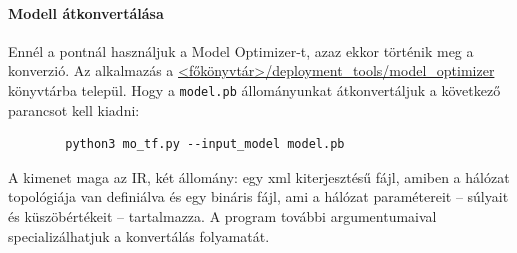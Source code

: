 \paragraph*{Modell átkonvertálása}
	Ennél a pontnál használjuk a Model Optimizer-t, azaz ekkor történik meg a konverzió. Az alkalmazás a \url{<főkönyvtár>/deployment_tools/model_optimizer} könyvtárba települ. Hogy a \verb|model.pb| állományunkat átkonvertáljuk a következő parancsot kell kiadni:
	\begin{verbatim}
		python3 mo_tf.py --input_model model.pb
	\end{verbatim}
	A kimenet maga az IR, két állomány: egy xml kiterjesztésű fájl, amiben a hálózat topológiája van definiálva és egy bináris fájl, ami a hálózat paramétereit -- súlyait és küszöbértékeit -- tartalmazza. 
	A program további argumentumaival specializálhatjuk a konvertálás folyamatát.

